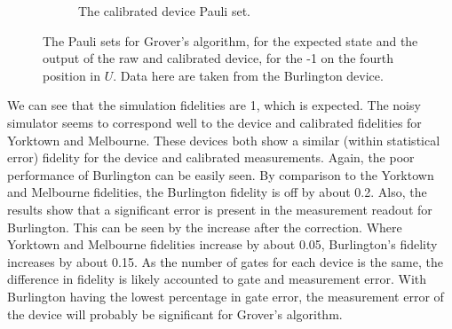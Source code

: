 \begin{figure}[h!]
\begin{subfigure}{.5\textwidth}
		\caption{The calibrated device Pauli set.}
		\label{fig:grov_pauli_cal}
	\end{subfigure}
	\caption{The Pauli sets for Grover's algorithm, for the expected state and the output of the raw and
		calibrated device, for the -1 on the fourth position in $U$.  Data here are taken from the Burlington device.}
	\label{fig:grover_paulis}
\end{figure}

We can see that the simulation fidelities are 1, which is expected. The noisy
simulator seems to correspond well to the device and calibrated fidelities for
Yorktown and Melbourne. These devices both show a similar (within statistical
error) fidelity for the device and calibrated measurements. Again, the poor
performance of Burlington can be easily seen. By comparison to the Yorktown and
Melbourne fidelities, the Burlington fidelity is off by about 0.2. Also, the
results show that a significant error is present in the measurement readout for
Burlington. This can be seen by the increase after the correction. Where
Yorktown and Melbourne fidelities increase by about 0.05, Burlington's fidelity
increases by about 0.15. As the number of gates for each device is the same, the
difference in fidelity is likely accounted to gate and measurement error. With
Burlington having the lowest percentage in gate error, the measurement error of
the device will probably be significant for Grover's algorithm.

